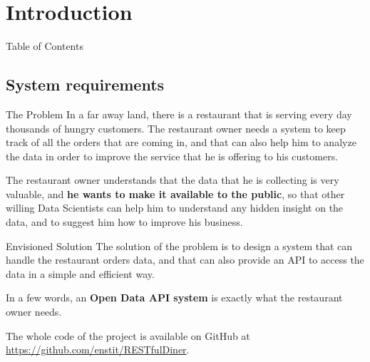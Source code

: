

\section[Introduction]{Introduction}

\begin{frame}{Table of Contents}
	\tableofcontents
\end{frame}

\subsection{System requirements}

\begin{frame}{The Problem}
	In a far away land, there is a restaurant that is serving every day
	thousands of hungry customers. The restaurant owner needs a system to keep
	track of all the orders that are coming in, and that can also help him to
	analyze the data in order to improve the service that he is offering to his
	customers.

	The restaurant owner understands that the data that he is collecting is very
	valuable, and \textbf{he wants to make it available to the public}, so that
	other willing Data Scientists can help him to understand any hidden insight
	on the data, and to suggest him how to improve his business.
\end{frame}

\begin{frame}{Envisioned Solution}
	The solution of the problem is to design a system that can handle the
	restaurant orders data, and that can also provide an API to access the data
	in a simple and efficient way.

	In a few words, an \textbf{Open Data API system} is exactly what the
	restaurant owner needs.

	The whole code of the project is available on GitHub at
	\url{https://github.com/enstit/RESTfulDiner}.
\end{frame}

